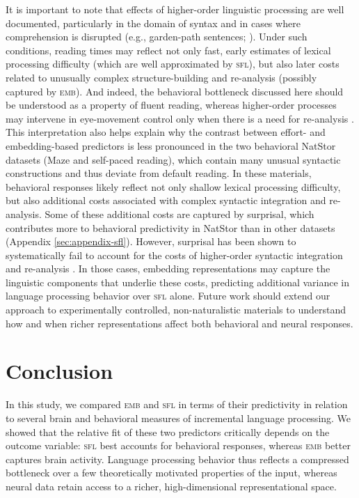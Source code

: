 \documentclass[11pt]{article}
\begin{document}
\smallskip 

It is important to note that effects of higher-order linguistic processing are well documented, particularly in the domain of syntax and in cases where comprehension is disrupted (e.g., garden-path sentences; \citealp{frazier1982making, ferreira1991recovery}). Under such conditions, reading times may reflect not only fast, early estimates of lexical processing difficulty (which are well approximated by \textsc{sfl}), but also later costs related to unusually complex structure-building and re-analysis (possibly captured by \textsc{emb}). And indeed, the behavioral bottleneck discussed here should be understood as a property of  fluent reading, whereas higher-order processes may intervene in eye-movement control only when there is a need for re-analysis \citep[see also][]{reichle1998toward}. This interpretation also helps explain why the contrast between effort- and embedding-based predictors is less pronounced in the two behavioral NatStor datasets (Maze and self-paced reading), which contain many unusual syntactic constructions and thus deviate from default reading. In these materials, behavioral responses likely reflect not only shallow lexical processing difficulty, but also additional costs associated with complex syntactic integration and re-analysis. Some of these additional costs are captured by surprisal, which contributes more to behavioral predictivity in NatStor than in other datasets (Appendix \ref{sec:appendix-sfl}). However, surprisal has been shown to systematically fail to account for the costs of higher-order syntactic integration and re-analysis \citep{arehalli2022syntactic, van2021single, hahn2022resource, wilcox-etal-2021-targeted, huang2024large}. In those cases, embedding representations may capture the linguistic components that underlie these costs, predicting additional variance in language processing behavior over \textsc{sfl} alone. Future work should extend our approach to experimentally controlled, non-naturalistic materials to understand how and when richer representations affect both behavioral and neural responses.

\section{Conclusion} \label{sec:conclusion}

In this study, we compared \textsc{emb} and \textsc{sfl} in terms of their predictivity in relation to several brain and behavioral measures of incremental language processing. We showed that the relative fit of these two predictors critically depends on the outcome variable: \textsc{sfl} best accounts for behavioral responses, whereas \textsc{emb} better captures brain activity. Language processing behavior thus reflects a compressed bottleneck over a few theoretically motivated properties of the input, whereas neural data retain access to a richer, high-dimensional representational space. %
\end{document}
